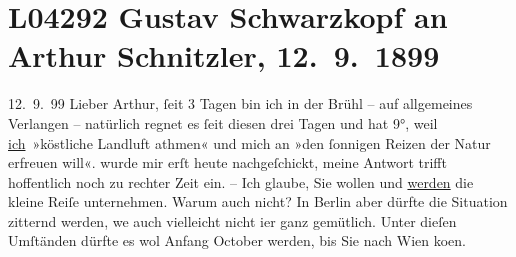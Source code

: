 

\section[Gustav Schwarzkopf an Arthur Schnitzler, 12. 9. 1899]{L04292 Gustav Schwarzkopf an Arthur Schnitzler, 12. 9. 1899}
\nopagebreak{}
\rehead{ }\normalsize\beginnumbering{}
\toendnotes[C]{\smallbreak\pagebreak[2]}
\toendnotes[C]{\smallbreak}
\toendnotes[C]{\smallbreak}
\pstart
           \raggedleft{}{\pb}12. 9. 99\pend
           \vspace{0.5em}
\pstart
           Lieber Arthur,{ }ſeit 3 Tagen bin ich in der Brühl – auf allgemeines Verlangen – natürlich regnet es{ }ſeit diesen
          drei Tagen und hat 9°, weil \uline{ich} »köstliche Landluft
          athmen« und mich an »den{ }ſonnigen Reizen der Natur erfreuen will«. \label{K_L04292-1v}\label{K_L04292-1} wurde mir
          erſt heute nachgeſchickt, meine Antwort trifft hoffentlich noch zu rechter Zeit ein. – Ich
          glaube, Sie wollen und \uline{werden} die kleine Reiſe
          unternehmen. Warum auch nicht? {\pb}In Berlin aber dürfte die Situation zitternd werden, we{\geminationn} auch vielleicht nicht i{\geminationm}er ganz
          gemütlich. Unter dieſen Umſtänden dürfte es wol Anfang October werden, bis Sie nach Wien ko{\geminationm}en.\pend
           
